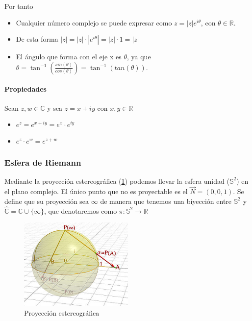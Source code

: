 \documentclass[paper=a4, fontsize=11pt]{scrartcl}
\numberwithin{equation}{section}
\numberwithin{figure}{section}
\numberwithin{table}{section}
\begin{document}
Por tanto
\begin{itemize}
\item Cualquier número complejo se puede expresar como $\boxed{z=|z|e^{i\theta}}$, con $\theta\in\mathbb{R}$.
\item De esta forma $|z|=|z|\cdot|e^{i\theta}|=|z|\cdot 1=|z|$
\item El ángulo que forma con el eje x es $\theta$, ya que $\theta = \tan^{-1}\left(\frac{sin(\theta)}{cos(\theta)}\right)=\tan^{-1}(tan(\theta))$.
\end{itemize}

\paragraph{Propiedades}
Sean $z,w\in\mathbb{C}$ y sea $z=x+iy$ con $x,y\in\mathbb{R}$
\begin{itemize}
\item $e^z = e^{x+iy} = e^x\cdot e^{iy}$
\item $e^{z}\cdot e^{w}=e^{z+w}$
\end{itemize}

\newpage
\subsubsection{Esfera de Riemann}\mbox{}
\label{sec:riemann}

Mediante la proyección estereográfica (\ref{fig:estereo}) podemos llevar la esfera unidad ($\mathbb{S}^2$) en el plano complejo. El único punto que no es proyectable es el $\vec{N}=(0,0,1)$. Se define que su proyección sea $\infty$ de manera que tenemos una biyección entre $\mathbb{S}^2$ y $\hat{\mathbb{C}}=\mathbb{C}\cup\{\infty\}$, que denotaremos como $\pi:\mathbb{S}^2\longrightarrow \mathbb{R}$

\begin{figure}[htbp]
\centering
\includegraphics[width=0.5\textwidth]{estereo.jpg}
\caption{Proyección estereográfica}
\label{fig:estereo}
\end{figure}
\end{document}
